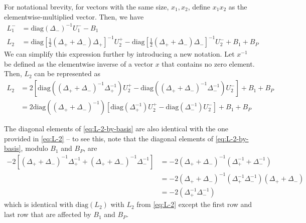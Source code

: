 \documentclass[11pt]{article}
\begin{document}
For notational brevity, for vectors with the same size, $x_1, x_2$, define $x_1 x_2$ as the elementwise-multiplied vector. Then, we have
\begin{align}
L_1^{-} &= \text{diag}(\Delta_{-} )^{-1} U_1^{-} - B_1 \\
L_2 &= \text{diag} \left[ \frac{1}{2} ( \Delta_+ + \Delta_- ) \Delta_+ \right]^{-1}  U_2^{+} - 
 \text{diag} \left[ \frac{1}{2} ( \Delta_+ + \Delta_- ) \Delta_- \right]^{-1}  U_2^{-} 
+ B_1 + B_P 
\end{align}
We can simplify this expression further by introducing a new notation. Let $x^{-1}$ be defined as the elementwise inverse of a vector $x$ that contains no zero element. Then, $L_2$ can be represented as
\begin{align}
L_2 &=
2\left[ \text{diag} \left( ( \Delta_+ + \Delta_- )^{-1} \Delta_+^{-1} \right) U_2^{+} - 
\text{diag} \left( ( \Delta_+ + \Delta_- )^{-1} \Delta_-^{-1} \right) U_2^{-}  \right]
+ B_1 + B_P \\ \label{eq:L-2-by-basis}
&= 2 \text{diag} \left( ( \Delta_+ + \Delta_- )^{-1} \right) \left[ \text{diag} \left(  \Delta_+^{-1} \right) U_2^{+} - 
\text{diag} \left(  \Delta_-^{-1} \right) U_2^{-}  \right]
+ B_1 + B_P
\end{align}


The diagonal elements of \eqref{eq:L-2-by-basis} are also identical with the one provided in \eqref{eq:L-2} -- to see this, note that the diagonal elements of \eqref{eq:L-2-by-basis}, modulo $B_1$ and $B_P$, are
\begin{align}
-2 \left[ (\Delta_+ + \Delta_-)^{-1} \Delta_+^{-1} + (\Delta_+ + \Delta_-)^{-1} \Delta_-^{-1} \right] &= -2 (\Delta_+ + \Delta_-)^{-1}  ( \Delta_+^{-1} + \Delta_-^{-1} ) \\
&= -2(\Delta_+ + \Delta_-)^{-1} (\Delta_+^{-1} \Delta_-^{-1}) (\Delta_+ + \Delta_- )  \\
&= -2 (\Delta_+^{-1} \Delta_-^{-1})
\end{align}
which is identical with $\text{diag} (L_2)$ with $L_2$ from \eqref{eq:L-2} except the first row and last row that are affected by $B_1$ and $B_P$.



\end{document}
